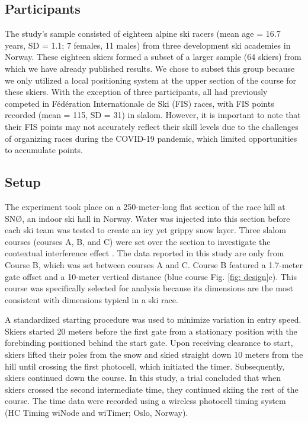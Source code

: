 \documentclass{article}
\begin{document}
\subsection*{Participants}
The study's sample consisted of eighteen alpine ski racers (mean age = 16.7 years, SD = 1.1; 7 females, 11 males) from three development ski academies in Norway. These eighteen skiers formed a subset of a larger sample (64 skiers) from which we have already published results. We chose to subset this group because we only utilized a local positioning system at the upper section of the course for these skiers. With the exception of three participants, all had previously competed in Fédération Internationale de Ski (FIS) races, with FIS points recorded (mean = 115, SD = 31) in slalom. However, it is important to note that their FIS points may not accurately reflect their skill levels due to the challenges of organizing races during the COVID-19 pandemic, which limited opportunities to accumulate points.

\subsection{Setup}
The experiment took place on a 250-meter-long flat section of the race hill at SNØ, an indoor ski hall in Norway. Water was injected into this section before each ski team was tested to create an icy yet grippy snow layer. Three slalom courses (courses A, B, and C) were set over the section to investigate the contextual interference effect \cite{magelssen_is_2022}. The data reported in this study are only from Course B, which was set between courses A and C. Course B featured a 1.7-meter gate offset and a 10-meter vertical distance (blue course Fig. \ref{fig: design}e). This course was specifically selected for analysis because its dimensions are the most consistent with dimensions typical in a ski race.

A standardized starting procedure was used to minimize variation in entry speed. Skiers started 20 meters before the first gate from a stationary position with the forebinding positioned behind the start gate. Upon receiving clearance to start, skiers lifted their poles from the snow and skied straight down 10 meters from the hill until crossing the first photocell, which initiated the timer. Subsequently, skiers continued down the course. In this study, a trial concluded that when skiers crossed the second intermediate time, they continued skiing the rest of the course. The time data were recorded using a wireless photocell timing system (HC Timing wiNode and wiTimer; Oslo, Norway).
\end{document}
